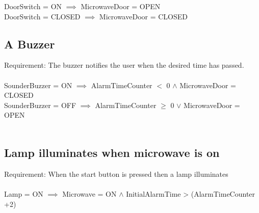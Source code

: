 DoorSwitch = ON  $\implies$ MicrowaveDoor = OPEN  \\
DoorSwitch = CLOSED $\implies$ MicrowaveDoor = CLOSED \\


\subsection{A Buzzer}
Requirement: The buzzer notifies the user when the desired time has passed. \\
 \\
SounderBuzzer = ON $\implies$ AlarmTimeCounter $<$ 0 $\wedge$ MicrowaveDoor = CLOSED \\
SounderBuzzer = OFF $\implies$ AlarmTimeCounter $\geq$ 0 $\vee$ MicrowaveDoor = OPEN   \\
\\

\subsection{Lamp illuminates when microwave is on}
Requirement: When the start button is pressed then a lamp illuminates \\
\\
Lamp = ON  $\implies$ Microwave = ON $\wedge$ InitialAlarmTime > (AlarmTimeCounter +2) \\


